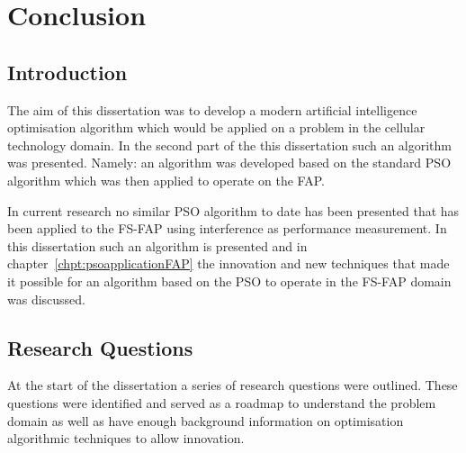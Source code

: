 \chapter{Conclusion}
\label{chpt:conclusion}
\section{Introduction}
The aim of this dissertation was to develop a modern artificial intelligence optimisation algorithm which would be applied on a problem in the cellular technology domain. In the second part of the this dissertation such an algorithm was presented. Namely: an algorithm was developed based on the standard PSO algorithm which was then applied to operate on the FAP. 

In current research no similar PSO algorithm to date has been presented that has been applied to the FS-FAP using interference as performance measurement. In this dissertation such an algorithm is presented and in chapter~\ref{chpt:psoapplicationFAP} the innovation and new techniques that made it possible for an algorithm based on the PSO to operate in the FS-FAP domain was discussed.

\section{Research Questions}
At the start of the dissertation a series of research questions were outlined. These questions were identified and served as a roadmap to understand the problem domain as well as have enough background information on optimisation algorithmic techniques to allow innovation.


